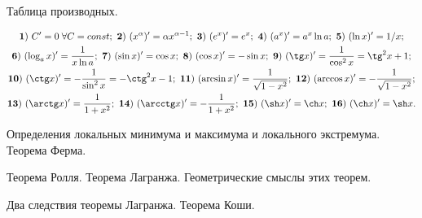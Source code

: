 \newpage

\begin{problem}
Таблица производных.
\end{problem}
\begin{multline*}
{\bf 1)} \ C'=0\;\forall C=const; \ {\bf 2)} \ (x^{\alpha})'=
\alpha x^{\alpha-1}; \ {\bf 3)} \ (e^x)'=e^x; \ {\bf 4)} \ (a^x)'=
a^x\ln a; \ {\bf 5)} \ (\ln x)'=1/x;\\
{\bf 6)} \ (\log_a x)'=
\frac{1}{x\ln a}; \ {\bf 7)} \ (\sin x)'=\cos x; \
{\bf 8)} \ (\cos x)'=-\sin x; \ {\bf 9)} \ (\tg x)'=
\frac{1}{\cos^2x}=\tg^2x+1;\\
{\bf 10)} \ (\ctg x)'=-\frac{1}{\sin^2x}=-\ctg^2x-1; \
{\bf 11)} \ (\arcsin x)'=\frac{1}{\sqrt{1-x^2}}; \
{\bf 12)} \ (\arccos x)'=-\frac{1}{\sqrt{1-x^2}};\\
{\bf 13)} \ (\arctg x)'=\frac{1}{1+x^2}; \
{\bf 14)} \ (\arcctg x)'=-\frac{1}{1+x^2}; \
{\bf 15)} \ (\sh x)'=\ch x; \
{\bf 16)} \ (\ch x)'=\sh x.
\end{multline*}

\newpage

\begin{problem}
Определения локальных минимума и максимума и локального экстремума. Теорема
Ферма.
\end{problem}

\newpage

\begin{problem}
Теорема Ролля. Теорема Лагранжа. Геометрические смыслы этих теорем.
\end{problem}

\newpage

\begin{problem}
Два следствия теоремы Лагранжа. Теорема Коши.\end{problem}
